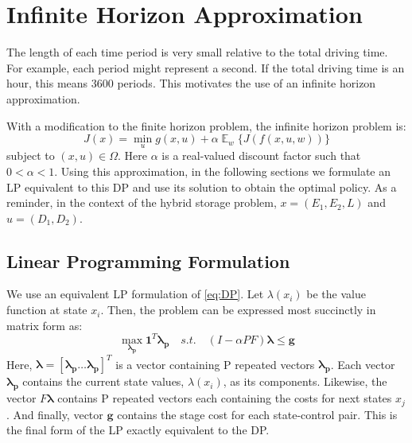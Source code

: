 \documentclass[conference]{IEEEtran}
\DeclareMathOperator{\E}{\mathbb{E}}
\begin{document}
\section{Infinite Horizon Approximation}
The length of each time period is very small relative to the total driving time. For example, each period might represent a second. If the total driving time is an hour, this means 3600 periods. This motivates the use of an infinite horizon approximation.

With a modification to the finite horizon problem, the infinite horizon problem is:
\begin{equation} \label{eq:DP}
J(x)=\min_{u} g(x,u) + \alpha\mathop{\E}_{w} \{J(f(x,u,w))\}
\end{equation} subject to $(x,u)\in\Omega$. Here $\alpha$ is a real-valued discount factor such that $0<\alpha<1$. Using this approximation, in the following sections we formulate an LP equivalent to this DP and use its solution to obtain the optimal policy. As a reminder, in the context of the hybrid storage problem, $x=(E_{1},E_{2},L)$ and $u=(D_{1},D_{2})$.


\subsection{Linear Programming Formulation}
We use an equivalent LP formulation of \eqref{eq:DP}. Let $\lambda(x_{i})$ be the value function at state $x_{i}$. Then, the problem can be expressed most succinctly in matrix form as:
\begin{equation} \label{eq:LPfinal}
    \max_{\boldsymbol{\lambda_{p}}} \boldsymbol{1}^{T} \boldsymbol{\lambda_{p}}
    \hspace{1em}s.t.\hspace{1em}
    (I-\alpha PF)\boldsymbol{\lambda} \leq \boldsymbol{g}
\end{equation} Here, $\boldsymbol{\lambda} = [\boldsymbol{\lambda_{p}}\hdots \boldsymbol{\lambda_{p}}]^{T}$ is a vector containing P repeated vectors $\boldsymbol{\lambda_{p}}$. Each vector $\boldsymbol{\lambda_{p}}$ contains the current state values, $\lambda(x_{i})$, as its components. Likewise, the vector $F\boldsymbol{\lambda}$ contains P repeated vectors each containing the costs for next states $x_{j}$. And finally, vector $\boldsymbol{g}$ contains the stage cost for each state-control pair. This is the final form of the LP exactly equivalent to the DP. 
\end{document}
